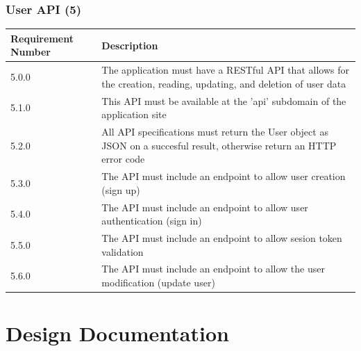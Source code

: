 \documentclass[12pt]{article}
\begin{document}
\subsubsection{User API (5)}

\setlength{\tabcolsep}{1cm}
\begin{longtable}{|l|p{8cm}|}
    \hline
    Requirement Number & Description                                                                                                           \\

    \hline\hline
    5.0.0              & The application must have a RESTful API that allows for the creation, reading, updating, and deletion of user data    \\

    \hline\hline
    5.1.0              & This API must be available at the 'api' subdomain of the application site                                             \\

    \hline\hline
    5.2.0              & All API specifications must return the User object as JSON on a succesful result, otherwise return an HTTP error code \\

    \hline\hline
    5.3.0              & The API must include an endpoint to allow user creation (sign up)                                                     \\

    \hline\hline
    5.4.0              & The API must include an endpoint to allow user authentication (sign in)                                               \\

    \hline\hline
    5.5.0              & The API must include an endpoint to allow sesion token validation                                                     \\

    \hline\hline
    5.6.0              & The API must include an endpoint to allow the user modification (update user)                                         \\

    \hline
\end{longtable}

\newpage

\section{Design Documentation}
\end{document}
